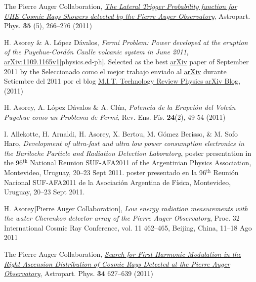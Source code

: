 \begin{etaremune}
\item {} The Pierre Auger Collaboration, 
\href{http://dx.doi.org/10.1016/j.astropartphys.2011.08.001}{\emph{The Lateral
Trigger Probability function for UHE Cosmic Rays Showers detected by the Pierre
Auger Observatory}}, Astropart. Phys. {\bf{35}} (5), 266--276 (2011)

\item {}H. Asorey \& A. López Dávalos, {\emph{Fermi Problem: Power
developed at the eruption of the Puyehue-Cordón Caulle volcanic system in June
2011}}, \href{http://arxiv.org/abs/1109.1165}{arXiv:1109.1165v1}[physics.ed-ph]. \ifeng
Selected as the best \href{http://arxiv.org}{arXiv} paper of September 2011 by the
\else
Seleccionado como el mejor trabajo enviado al \href{http://arxiv.org}{arXiv} durante Setiembre del 2011 por el blog 
\fi
\href{http://www.technologyreview.com/blog/arxiv/27140/}{M.I.T. Technology
Review Physics arXiv Blog}, (2011)

\item {}H. Asorey, A. López Dávalos \& A. Clúa, {\emph{Potencia de la Erupción del Volcán Puyehue como un Problema de Fermi}}, Rev. Ens. Fís. {\bf{24}}(2), 49-54 (2011)

\item {}I. Allekotte, H. Arnaldi, H. Asorey, X. Bertou, M. Gómez Berisso, \& M. Sofo Haro, {\emph{Development of ultra-fast and ultra low power consumption electronics in the Bariloche Particle and Radiation Detection Laboratory}},
\ifeng
poster presentation in the 96$^{\mathrm{th}}$ National Reunion SUF-AFA2011 of the Argentinian Physics Association, Montevideo, Uruguay, 20--23 Sept 2011.
\else
poster presentado en la 96$^{\mathrm{th}}$ Reunión Nacional SUF-AFA2011 de la Asociación Argentina de Física, Montevideo, Uruguay, 20--23 Sept 2011.
\fi

\item {}H. Asorey[Pierre Auger Collaboration], {\emph{Low energy radiation
measurements with the water Cherenkov detector array of the Pierre Auger
Observatory}}, \en Proc. 32 International Cosmic Ray Conference, vol. 11
462--465, Beijing, China, 11--18 Ago 2011

\item {}The Pierre Auger Collaboration,
\href{http://dx.doi.org/10.1016/j.astropartphys.2010.12.007}{\emph{Search for
First Harmonic Modulation in the Right Ascension Distribution of Cosmic Rays
Detected at the Pierre Auger Observatory}}, Astropart. Phys. {\bf 34} 627--639
(2011)


\end{etaremune}
